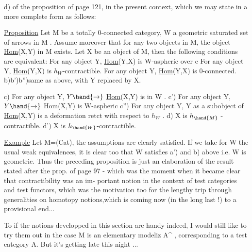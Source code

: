
d) of the proposition of page 121, in the present context, which we may
state in a more complete form as follows:

\uline{Proposition} Let M be a totally  0-connected category, W a geometric
saturated set of arrows in M . Assume moreover that for any two objects
in M, the object \uline{Hom}(X,Y) in M exists. Let X be an object of M, then
the following conditions  are equivalent:
 For any object Y, \uline{Hom}(Y,X) is W-aspheric over e 
 For any object Y, \uline{Hom}(Y,X) is $h_W$-contractible.
 For any object Y, \uline{Hom}(Y,X) is 0-connected.
b)b')b'')same as above, with Y replaced by X.

c) For any object Y, $Y\hand{\rightarrow}$ \uline{Hom}(X,Y) is in W .
c') For any object Y, $Y\hand{\rightarrow}$ \uline{Hom}(X,Y) is W-aspheric
c'') For any object Y, Y as a subobject of \uline{Hom}(X,Y) is a deformation
retct with respect to $h_W$ .
d) X is $h_{\hand{M}}$ - contractible.
d') X is $h_{\hand{W}}$-contractible.

\uline{Example} Let M=(Cat), the assumptions  are clearly satisfied. If we take
for W the usual weak equivalences, it is clear too that W  satisfies
a') and b) above i.e. W is geometric. Thus the preceding proposition is
just an elaboration of the result stated after the prop. of page 97 -
which was the moment when it became clear that contractibility was an im-%
portant notion in the context of test categories and test functors, 
which was the  motivation too for the  lengthy trip through generalities on
homotopy notions,which is coming now (in the long last !) to a provisional
end...

To  if the notions developped in this section are handy indeed,
I would still like to try them out in the case M is an elementary modeliz
A\^{} , corresponding to a test category A. But it's getting late this
night ...

